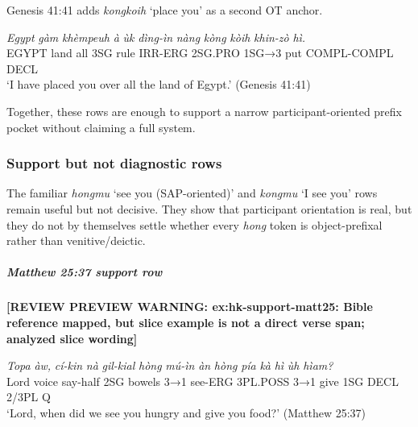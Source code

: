 \documentclass[
  11pt,
  a4paper,
]{article}
\newcommand{\tdim}[1]{\textit{#1}}
\newcommand{\tdimword}[1]{\textit{#1}}
\renewcommand{\textsc}[1]{{\footnotesize\MakeUppercase{#1}}}
\newcommand{\glossquote}[1]{`#1'}
\newcommand{\reviewwarninginline}[1]{\textbf{#1}\par\smallskip}
\begin{document}
Genesis 41:41 adds \tdim{kongkoih} \glossquote{place you} as a second OT
anchor.

\begin{exe}
\ex \label{ex:hk-core-gen41}
\gll \tdimword{Egypt} \tdimword{gàm} \tdimword{khèmpeuh} \tdimword{à} \tdimword{ùk} \tdimword{dìng-ìn} \tdimword{nàng} \tdimword{kòng} \tdimword{kòih} \tdimword{khin-zò} \tdimword{hì.} \\
     \textsc{egypt} land all \textsc{3sg} rule \textsc{irr}-\textsc{erg} \textsc{2sg}.\textsc{pro} \textsc{1sg→3} put \textsc{compl}-\textsc{compl} \textsc{decl} \\
\glt \glossquote{I have placed you over all the land of Egypt.} (Genesis 41:41)
\end{exe}

Together, these rows are enough to support a narrow participant-oriented
prefix pocket without claiming a full system.

\subsubsection{Support but not diagnostic
rows}\label{support-but-not-diagnostic-rows}

The familiar \tdim{hongmu} \glossquote{see you (SAP-oriented)} and
\tdim{kongmu} \glossquote{I see you} rows remain useful but not
decisive. They show that participant orientation is real, but they do
not by themselves settle whether every \tdim{hong} token is
object-prefixal rather than venitive/deictic.

\subparagraph{Matthew 25:37 support row}\label{matthew-2537-support-row}

\begin{exe}
\ex \label{ex:hk-support-matt25}
\reviewwarninginline{[REVIEW PREVIEW WARNING: ex:hk-support-matt25: Bible reference mapped, but slice example is not a direct verse span; analyzed slice wording]}
\gll \tdimword{Topa} \tdimword{àw,} \tdimword{cí-kin} \tdimword{nà} \tdimword{gil-kial} \tdimword{hòng} \tdimword{mú-ìn} \tdimword{àn} \tdimword{hòng} \tdimword{pía} \tdimword{kà} \tdimword{hì} \tdimword{ùh} \tdimword{hìam?} \\
     Lord voice say-half \textsc{2sg} bowels \textsc{3→1} see-\textsc{erg} \textsc{3pl}.\textsc{poss} \textsc{3→1} give \textsc{1sg} \textsc{decl} 2/3PL \textsc{q} \\
\glt \glossquote{Lord, when did we see you hungry and give you food?} (Matthew 25:37)
\end{exe}
\end{document}
